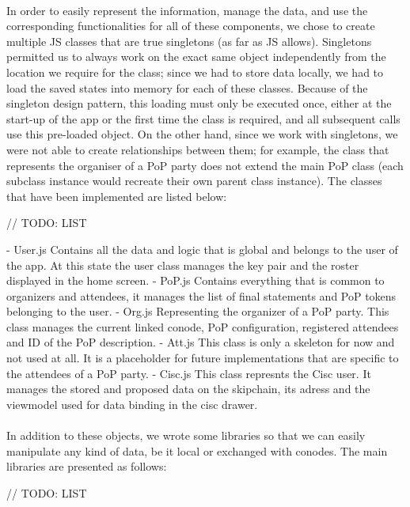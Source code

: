 \paragraph{}
In order to easily represent the information, manage the data, and use the corresponding functionalities for all of these components, we chose to create multiple JS classes that are true singletons (as far as JS allows). Singletons permitted us to always work on the exact same object independently from the location we require for the class; since we had to store data locally, we had to load the saved states into memory for each of these classes. Because of the singleton design pattern, this loading must only be executed once, either at the start-up of the app or the first time the class is required, and all subsequent calls use this pre-loaded object. On the other hand, since we work with singletons, we were not able to create relationships between them; for example, the class that represents the organiser of a PoP party does not extend the main PoP class (each subclass instance would recreate their own parent class instance). The classes that have been implemented are listed below:

// TODO: LIST

- User.js
  Contains all the data and logic that is global and belongs to the user of the app. At this state the user class manages the key pair and the roster displayed in the home screen.
- PoP.js
  Contains everything that is common to organizers and attendees, it manages the list of final statements and PoP tokens belonging to the user.
  - Org.js
  Representing the organizer of a PoP party. This class manages the current linked conode, PoP configuration, registered attendees and ID of the PoP description.
  - Att.js
  This class is only a skeleton for now and not used at all. It is a placeholder for future implementations that are specific to the attendees of a PoP party.
- Cisc.js
  This class represnts the Cisc user. It manages the stored and proposed data on the skipchain, its adress and the viewmodel used for data binding in the cisc drawer.

\paragraph{}
In addition to these objects, we wrote some libraries so that we can easily manipulate any kind of data, be it local or exchanged with conodes. The main libraries are presented as follows:

// TODO: LIST

